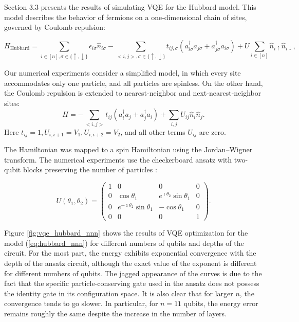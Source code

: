 Section 3.3 presents the results of simulating VQE for the Hubbard model. This model describes the behavior of fermions on a one-dimensional chain of sites, governed by Coulomb repulsion:

\begin{equation}
    H_{\text{Hubbard}} = \sum_{i \in [n], \sigma \in \{\uparrow, \downarrow\}} \epsilon_{i \sigma} \hat{n}_{i \sigma}
    - \sum_{<i, j>, \sigma \in \{\uparrow, \downarrow\}} t_{ij, \sigma} (a^\dagger_{i \sigma} a_{j \sigma} + a^\dagger_{j \sigma} a_{i \sigma})
    + U \sum_{i \in [n]} \hat{n}_{i \uparrow} \hat{n}_{i \downarrow},
\end{equation}

Our numerical experiments consider a simplified model, in which every site accommodates only one particle, and all particles are spinless. On the other hand, the Coulomb repulsion is extended to nearest-neighbor and next-nearest-neighbor sites:
\begin{equation}
    \label{eq:hubbard_nnn}
    H = - \sum_{<i, j>} t_{ij} (a^\dagger_{i} a_{j} + a^\dagger_{j} a_{i})
    + \sum_{i, j} U_{ij} \hat{n}_{i} \hat{n}_{j}.
\end{equation}
Here $t_{ij} = 1, U_{i, i+1} = V_1, U_{i, i+2} = V_2$, and all other terms $U_{ij}$ are zero.

The Hamiltonian was mapped to a spin Hamiltonian using the Jordan--Wigner transform. The numerical experiments use the checkerboard ansatz with two-qubit blocks preserving the number of particles \cite{barkoutsos_quantum_2018}:

\begin{equation}
\label{eq:particle-conserving_gate}
    U(\theta_1, \theta_2) = 
    \begin{pmatrix}
1 & 0 & 0 & 0 \\
0 & \cos{\theta_1} & e^{\imath \theta_2} \sin \theta_1 & 0 \\
0  & e^{-\imath \theta_2} \sin \theta_1  & -\cos{\theta_1} & 0  \\
0 & 0 & 0 & 1
\end{pmatrix}.
\end{equation}

Figure \ref{fig:vqe_hubbard_nnn} shows the results of VQE optimization for the model (\ref{eq:hubbard_nnn}) for different numbers of qubits and depths of the circuit. For the most part, the energy exhibits exponential convergence with the depth of the ansatz circuit, although the exact value of the exponent is different for different numbers of qubits. The jagged appearance of the curves is due to the fact that the specific particle-conserving gate used in the ansatz does not possess the identity gate in its configuration space. It is also clear that for larger $n$, the convergence tends to go slower. In particular, for $n=11$ qubits, the energy error remains roughly the same despite the increase in the number of layers.

